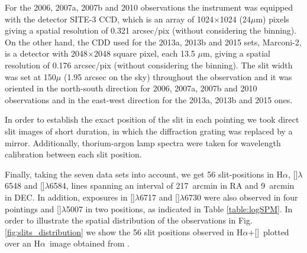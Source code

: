 \documentclass[a4paper,fleqn,usenatbib]{mnras}     %
\newcommand{\Ha} {H$\alpha$}      		%
\newcommand{\NII} {[\ion{N}{ii}]}            %
\newcommand{\SII} {[\ion{S}{ii}]}             %
\newcommand{\OIII} {[\ion{O}{iii}]}          %
\begin{document}
For the 2006, 2007a, 2007b and 2010 observations the instrument was equipped with the detector SITE-3 CCD, which is an array 
of 1024$\times$1024 (24$\mu$m) pixels giving a spatial resolution of 0.321 arcsec/pix (without considering the binning). On the 
other hand, the CDD used for the 2013a, 2013b and 2015 sets, Marconi-2, is a detector with 2048$\times$2048 square pixel, each 13.5 $\mu$m, 
giving a spatial resolution of 0.176 arcsec/pix (without considering the binning). The slit width was set at 150$\mu$ (1.95 arcsec 
on the sky) throughout the observation and it was oriented in the north-south direction for 2006, 2007a, 2007b and 2010 observations and in the east-west 
direction for the 2013a, 2013b and 2015 ones.  

In order to establish the exact position of the slit in each pointing we took direct slit images of short duration, in which the diffraction 
grating was replaced by a mirror. Additionally, thorium-argon lamp spectra were taken for wavelength calibration between each slit position.

Finally, taking the seven data sets into account, we get 56 slit-positions in \Ha, \NII$\lambda$6548 and \NII$\lambda$6584, lines spanning an interval 
of 217~arcmin in RA and 9~arcmin in DEC. In addition, exposures in \SII$\lambda$6717 and \SII$\lambda$6730 were also observed in four 
pointings and \OIII$\lambda$5007 in two positions, as indicated in Table \ref{table:logSPM}. In order to illustrate the spatial distribution of the 
observations in Fig. \ref{fig:slits_distribution} we show the 56 slit positions observed in \Ha+\NII~plotted over an \Ha~image obtained from \citet{DaRio2009}.\\
\end{document}
